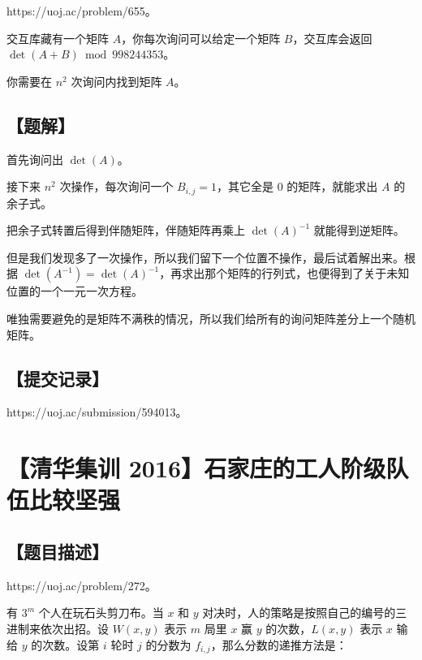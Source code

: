 \documentclass[UTF8,12pt,a4paper]{ctexart}
\begin{document}
	https://uoj.ac/problem/655。
	
	交互库藏有一个矩阵 $A$，你每次询问可以给定一个矩阵 $B$，交互库会返回 $\det(A+B) \bmod 998244353$。
	
	你需要在 $n^2$ 次询问内找到矩阵 $A$。
	
	\subsection*{【题解】}
	
	首先询问出 $\det(A)$。
	
	接下来 $n^2$ 次操作，每次询问一个 $B_{i,j}=1$，其它全是 $0$ 的矩阵，就能求出 $A$ 的余子式。
	
	把余子式转置后得到伴随矩阵，伴随矩阵再乘上 $\det(A)^{-1}$ 就能得到逆矩阵。
	
	但是我们发现多了一次操作，所以我们留下一个位置不操作，最后试着解出来。根据 $\det(A^{-1})=\det(A)^{-1}$，再求出那个矩阵的行列式，也便得到了关于未知位置的一个一元一次方程。
	
	唯独需要避免的是矩阵不满秩的情况，所以我们给所有的询问矩阵差分上一个随机矩阵。
	
	\subsection*{【提交记录】}
	
	https://uoj.ac/submission/594013。
	
	
	\section*{【清华集训 2016】石家庄的工人阶级队伍比较坚强}
	
	\subsection*{【题目描述】}
	
	https://uoj.ac/problem/272。
	
	有 $3^m$ 个人在玩石头剪刀布。当 $x$ 和 $y$ 对决时，人的策略是按照自己的编号的三进制来依次出招。设 $W(x,y)$ 表示 $m$ 局里 $x$ 赢 $y$ 的次数，$L(x,y)$ 表示 $x$ 输给 $y$ 的次数。设第 $i$ 轮时 $j$ 的分数为 $f_{i,j}$，那么分数的递推方法是：
	
\end{document}
